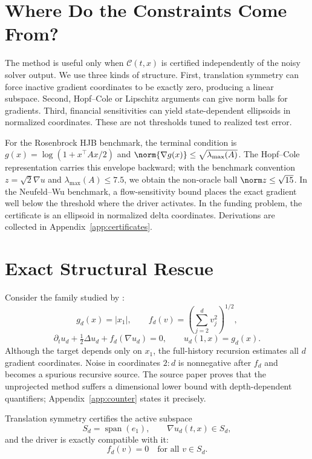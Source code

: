 \section{Where Do the Constraints Come From?}
\label{sec:certificates-main}
The method is useful only when $\mathcal C(t,x)$ is certified independently of the noisy solver output. We use three kinds of structure. First, translation symmetry can force inactive gradient coordinates to be exactly zero, producing a linear subspace. Second, Hopf--Cole or Lipschitz arguments can give norm balls for gradients. Third, financial sensitivities can yield state-dependent ellipsoids in normalized coordinates. These are not thresholds tuned to realized test error.

For the Rosenbrock HJB benchmark, the terminal condition is $g(x)=\log(1+x^\top Ax/2)$ and $\norm{\nabla g(x)}\le\sqrt{\lambda_{\max}(A)}$. The Hopf--Cole representation carries this envelope backward; with the benchmark convention $z=\sqrt2\nabla u$ and $\lambda_{\max}(A)\le7.5$, we obtain the non-oracle ball $\norm z\le\sqrt{15}$. In the Neufeld--Wu benchmark, a flow-sensitivity bound places the exact gradient well below the threshold where the driver activates. In the funding problem, the certificate is an ellipsoid in normalized delta coordinates. Derivations are collected in Appendix~\ref{app:certificates}.

\section{Exact Structural Rescue}
\label{sec:rescue}
Consider the family studied by \citet{HutzenthalerNguyen2025}:
\begin{equation}
g_d(x)=|x_1|,\qquad
f_d(v)=\left(\sum_{j=2}^dv_j^2\right)^{1/2},
\label{eq:counterdata}
\end{equation}
\begin{equation}
\partial_tu_d+\tfrac12\Delta u_d+f_d(\nabla u_d)=0,
\qquad u_d(1,x)=g_d(x).
\label{eq:counterpde}
\end{equation}
Although the target depends only on $x_1$, the full-history recursion estimates all $d$ gradient coordinates. Noise in coordinates $2{:}d$ is nonnegative after $f_d$ and becomes a spurious recursive source. The source paper proves that the unprojected method suffers a dimensional lower bound with depth-dependent quantifiers; Appendix~\ref{app:counter} states it precisely.

Translation symmetry certifies the active subspace
\[
S_d=\operatorname{span}(e_1),\qquad \nabla u_d(t,x)\in S_d,
\]
and the driver is exactly compatible with it:
\begin{equation}
f_d(v)=0\quad\text{for all }v\in S_d.
\label{eq:null}
\end{equation}

